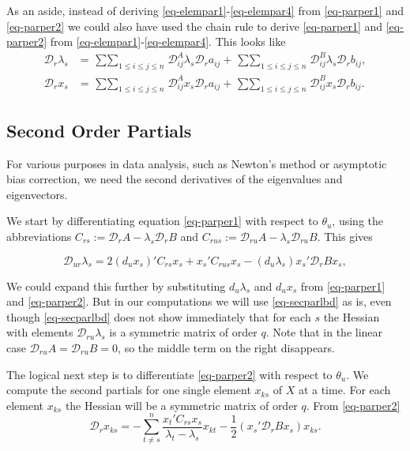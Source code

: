 \documentclass[
  12pt,
  letterpaper,
  DIV=11,
  numbers=noendperiod]{scrartcl}
\begin{document}
As an aside, instead of deriving \eqref{eq-elempar1}-\eqref{eq-elempar4}
from \eqref{eq-parper1} and \eqref{eq-parper2} we could also have used
the chain rule to derive \eqref{eq-parper1} and \eqref{eq-parper2} from
\eqref{eq-elempar1}-\eqref{eq-elempar4}. This looks like
\begin{subequations}
\begin{align}
\mathcal{D}_r\lambda_s&=\mathop{\sum\sum}_{1\leq i\leq j\leq n}\mathcal{D}_{ij}^A\lambda_s\mathcal{D}_ra_{ij}+\mathop{\sum\sum}_{1\leq i\leq j\leq n}\mathcal{D}_{ij}^B\lambda_s\mathcal{D}_rb_{ij},\label{eq-elemchain1}\\
\mathcal{D}_rx_s&=\mathop{\sum\sum}_{1\leq i\leq j\leq n}\mathcal{D}_{ij}^Ax_s\mathcal{D}_ra_{ij}+\mathop{\sum\sum}_{1\leq i\leq j\leq n}\mathcal{D}_{ij}^Bx_s\mathcal{D}_rb_{ij}.\label{eq-elemchain2}
\end{align}
\end{subequations}

\subsection{Second Order Partials}\label{sec-second}

For various purposes in data analysis, such as Newton's method or
asymptotic bias correction, we need the second derivatives of the
eigenvalues and eigenvectors.

We start by differentiating equation \eqref{eq-parper1} with respect to
\(\theta_u\), using the abbreviations
\(C_{rs}:=\mathcal{D}_rA-\lambda_s\mathcal{D}_rB\) and
\(C_{rus}:=\mathcal{D}_{ru}A-\lambda_s\mathcal{D}_{ru}B\). This gives

\begin{equation}
\mathcal{D}_{ur}\lambda_s=2(d_ux_s)'C_{rs}x_s+
x_s'C_{rus}x_s-(d_u\lambda_s)x_s'\mathcal{D}_rBx_s,
\label{eq-secparlbd}
\end{equation}

We could expand this further by substituting \(d_u\lambda_s\) and
\(d_ux_s\) from \eqref{eq-parper1} and \eqref{eq-parper2}. But in our
computations we will use \eqref{eq-secparlbd} as is, even though
\eqref{eq-secparlbd} does not show immediately that for each \(s\) the
Hessian with elements \(\mathcal{D}_{ru}\lambda_s\) is a symmetric
matrix of order \(q\). Note that in the linear case
\(\mathcal{D}_{ru}A=\mathcal{D}_{ru}B=0\), so the middle term on the
right disappears.

The logical next step is to differentiate \eqref{eq-parper2} with
respect to \(\theta_u\). We compute the second partials for one single
element \(x_{ks}\) of \(X\) at a time. For each element \(x_{ks}\) the
Hessian will be a symmetric matrix of order \(q\). From
\eqref{eq-parper2} \begin{equation}
\mathcal{D}_rx_{ks}=-\sum_{t\not= s}^n\frac{x_t'C_{rs}x_s}{\lambda_t-\lambda_s}x_{kt}-\frac12(x_s'\mathcal{D}_rBx_s)x_{ks}.\label{eq-parper3}
\end{equation}
\end{document}
